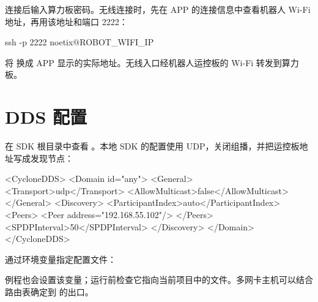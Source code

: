 连接后输入算力板密码。无线连接时，先在 APP 的连接信息中查看机器人 Wi-Fi 地址，再用该地址和端口 2222：
\par\noindent\begin{minipage}{\linewidth}
\begin{command}
ssh -p 2222 noetix@ROBOT_WIFI_IP
\end{command}
\end{minipage}\par

将  换成 APP 显示的实际地址。无线入口经机器人运控板的 Wi-Fi 转发到算力板。
\section{DDS 配置}
在 SDK 根目录中查看 。本地 SDK 的配置使用 UDP，关闭组播，并把运控板地址写成发现节点：
\par\noindent\begin{minipage}{\linewidth}
\begin{command}
<CycloneDDS>
  <Domain id="any">
    <General>
      <Transport>udp</Transport>
      <AllowMulticast>false</AllowMulticast>
    </General>
    <Discovery>
      <ParticipantIndex>auto</ParticipantIndex>
      <Peers>
        <Peer address="192.168.55.102"/>
      </Peers>
      <SPDPInterval>50</SPDPInterval>
    </Discovery>
  </Domain>
</CycloneDDS>
\end{command}
\end{minipage}\par

通过环境变量指定配置文件：
\par\noindent\begin{minipage}{\linewidth}
\end{minipage}\par

例程也会设置该变量；运行前检查它指向当前项目中的文件。多网卡主机可以结合路由表确定到  的出口。
